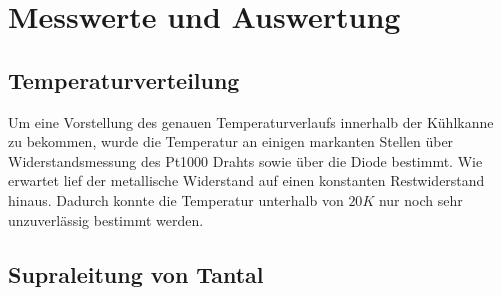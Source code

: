 \section{Messwerte und Auswertung} %
\label{sec:messwerte_und_auswertung}

	\subsection{Temperaturverteilung} %
	\label{sub:temperaturverteilung}
	
		Um eine Vorstellung des genauen Temperaturverlaufs innerhalb der Kühlkanne zu bekommen, wurde die Temperatur an einigen markanten Stellen über Widerstandsmessung des Pt1000 Drahts sowie über die Diode bestimmt.
		Wie erwartet lief der metallische Widerstand auf einen konstanten Restwiderstand hinaus.
		Dadurch konnte die Temperatur unterhalb von $20\unit{K}$ nur noch sehr unzuverlässig bestimmt werden.







	\subsection{Supraleitung von Tantal} %
	\label{sub:supraleitung_von_tantal}

